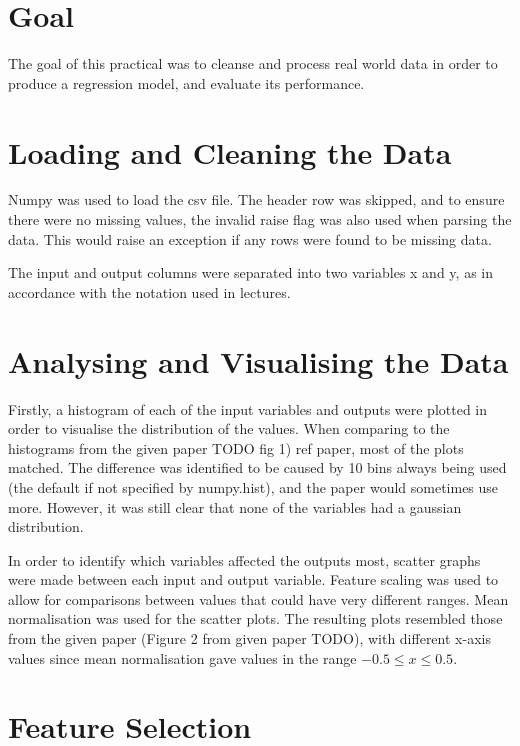 \documentclass[12pt]{article}
\begin{document}
\part*{Goal}

The goal of this practical was to cleanse and process real world data in order to produce a regression model, and evaluate its performance. \citep{createreactapp}

\part{Loading and Cleaning the Data}

Numpy was used to load the csv file. The header row was skipped, and to ensure there were no missing values, the invalid raise flag was also used when parsing the data. This would raise an exception if any rows were found to be missing data. 

The input and output columns were separated into two variables x and y, as in accordance with the notation used in lectures.

\part{Analysing and Visualising the Data}

Firstly, a histogram of each of the input variables and outputs were plotted in order to visualise the distribution of the values. When comparing to the histograms from the given paper TODO fig 1) ref paper, most of the plots matched. The difference was identified to be caused by 10 bins always being used (the default if not specified by numpy.hist), and the paper would sometimes use more. However, it was still clear that none of the variables had a gaussian distribution.

In order to identify which variables affected the outputs most, scatter graphs were made between each input and output variable. Feature scaling was used to allow for comparisons between values that could have very different ranges. Mean normalisation was used for the scatter plots. The resulting plots resembled those from the given paper (Figure 2 from given paper TODO), with different x-axis values since mean normalisation gave values in the range $-0.5 \leq x \leq 0.5 $.

\part{Feature Selection}
\end{document}
